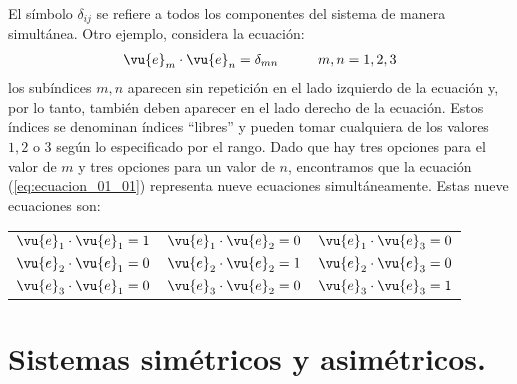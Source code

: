 El símbolo $\delta_{ij}$ se refiere a todos los componentes del sistema de manera simultánea. Otro ejemplo, considera la ecuación:
\begin{align}
\vu{e}_{m} \cdot \vu{e}_{n} = \delta_{mn} \hspace{1cm} m, n = 1, 2, 3
\label{eq:ecuacion_01_01}
\end{align}
los subíndices $m, n$ aparecen sin repetición en el lado izquierdo de la ecuación y, por lo tanto, también deben aparecer en el lado derecho de la ecuación. Estos índices se denominan índices \enquote{libres} y pueden tomar cualquiera de los valores $1, 2$ o $3$ según lo especificado por el rango. Dado que hay tres opciones para el valor de $m$ y tres opciones para un valor de $n$, encontramos que la ecuación (\ref{eq:ecuacion_01_01}) representa nueve ecuaciones simultáneamente. Estas nueve ecuaciones son:
\begin{table}[H]
\large
\centering
\begin{tabular}{c c c}
$\vu{e}_{1} \cdot \vu{e}_{1} = 1$ & $\vu{e}_{1} \cdot \vu{e}_{2} = 0$ & $\vu{e}_{1} \cdot \vu{e}_{3} = 0$ \\
$\vu{e}_{2} \cdot \vu{e}_{1} = 0$ & $\vu{e}_{2} \cdot \vu{e}_{2} = 1$ & $\vu{e}_{2} \cdot \vu{e}_{3} = 0$ \\
$\vu{e}_{3} \cdot \vu{e}_{1} = 0$ & $\vu{e}_{3} \cdot \vu{e}_{2} = 0$ & $\vu{e}_{3} \cdot \vu{e}_{3} = 1$
\end{tabular}
\end{table}

\section{Sistemas simétricos y asimétricos.}

